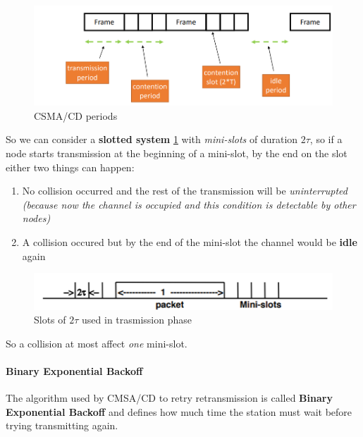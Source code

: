 \documentclass[10pt,a4paper]{report}
\theoremstyle{definition}
\begin{document}
\begin{figure}[h]
	\centering\includegraphics[scale=0.50]{images/Pasted image 20230225094641.png}
	\caption{CSMA/CD periods}
\end{figure}

So we can consider a \textbf{slotted system} \ref{slotted-system} with \textit{mini-slots} of duration $2\tau$, so if a node starts transmission at the beginning of a mini-slot, by the end on the slot either two things can happen:
\begin{enumerate}
	\item 
	No collision occurred and the rest of the transmission will be \textit{uninterrupted (because now the channel is occupied and this condition is detectable by other nodes)}
	\item 
	A collision occured but by the end of the mini-slot the channel would be \textbf{idle} again

	

\end{enumerate}

\begin{figure}[h]
	\centering
	\includegraphics[scale=0.50]{images/Pasted image 20230225094934.png}
	\caption{Slots of $2\tau$ used in trasmission phase}
	\label{slotted-system}
\end{figure}
	So a collision at most affect \textit{one} mini-slot.
	
	
\paragraph{Binary Exponential Backoff}\label{sec:binary-exponential-backoff}
The algorithm used by CMSA/CD to retry retransmission is called \textbf{Binary Exponential Backoff} and defines how much time the station must wait before trying transmitting again.
\end{document}
